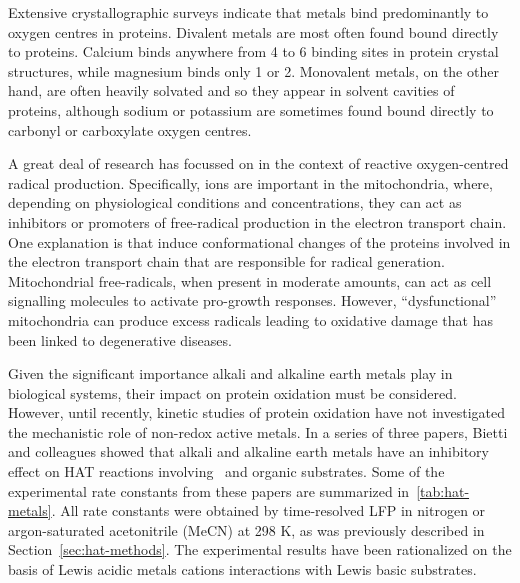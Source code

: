 Extensive crystallographic surveys indicate that metals bind predominantly to
oxygen centres in proteins.\cite{Harding1999, Harding2004, Hsin2008} Divalent
metals are most often found bound directly to proteins. Calcium binds anywhere
from 4 to 6 binding sites in protein crystal structures, while magnesium binds
only 1 or 2. Monovalent metals, on the other hand, are often heavily solvated
and so they appear in solvent cavities of proteins, although sodium or potassium
are sometimes found bound directly to carbonyl or carboxylate oxygen
centres.\cite{Harding2010}

A great deal of research has focussed on  in the context of reactive
oxygen-centred radical production.\cite{Goerlach2015} Specifically, 
ions are important in the mitochondria, where, depending on physiological
conditions and concentrations, they can act as inhibitors or promoters of
free-radical production in the electron transport chain.\cite{AdamVizi2010} One
explanation is that  induce conformational changes of the proteins
involved in the electron transport chain that are responsible for radical
generation.\cite{Brookes2004} Mitochondrial free-radicals, when present in
moderate amounts, can act as cell signalling molecules to activate pro-growth
responses.\cite{Sullivan2014} However, ``dysfunctional'' mitochondria can
produce excess radicals leading to oxidative damage that has been linked to
degenerative diseases.

Given the significant importance alkali and alkaline earth metals play in
biological systems, their impact on protein oxidation must be considered.
However, until recently, kinetic studies of protein oxidation have not
investigated the mechanistic role of non-redox active metals. In a series of
three papers,\cite{Salamone2013a, Salamone2015metals, Salamone2016} Bietti and
colleagues showed that alkali and alkaline earth metals have an inhibitory
effect on HAT reactions involving \cumo\ and organic substrates. Some of the
experimental rate constants from these papers are summarized
in~\ref{tab:hat-metals}. All rate constants were obtained by time-resolved LFP
in nitrogen or argon-saturated acetonitrile (MeCN) at 298 K, as was previously
described in Section~\ref{sec:hat-methods}. The experimental results have been
rationalized on the basis of Lewis acidic metals cations interactions with Lewis
basic substrates.


